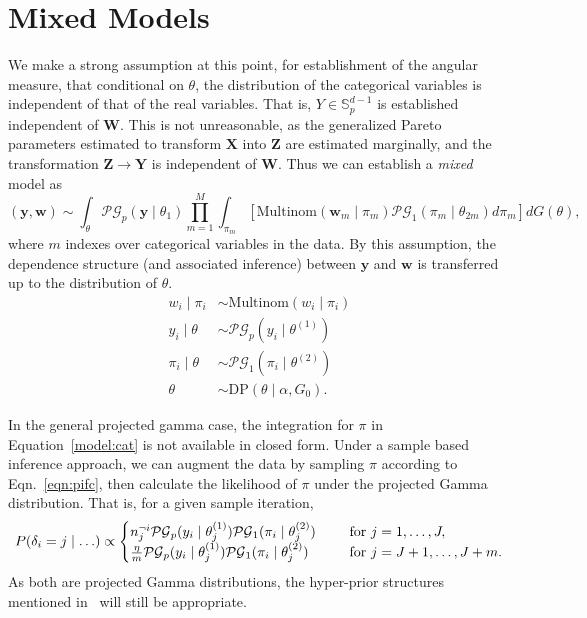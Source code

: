 \section{Mixed Models}
We make a strong assumption at this point, for establishment of the angular measure,
that conditional on $\theta$, the distribution of the categorical variables is independent 
of that of the real variables.  That is, $Y \in {\mathbb S}_{p}^{d-1}$ is established
independent of $\bm{W}$.  This is not unreasonable, as the generalized Pareto parameters 
estimated to transform $\bm{X}$ into $\bm{Z}$ are estimated marginally, and the transformation $\bm{Z}\to\bm{Y}$ is independent of $\bm{W}$.  Thus we can establish a \emph{mixed} model as
\begin{equation}
    \label{model:mixed}
    (\bm{y},\bm{w})\sim \int_{\theta}\mathcal{PG}_{p}(\bm{y}\mid\theta_1)\prod_{m = 1}^M\int_{\pi_m}\left[\text{Multinom}(\bm{w}_m\mid\pi_m)\mathcal{PG}_1(\pi_m\mid\theta_{2m})d\pi_{m}\right]dG(\theta),
\end{equation}
where $m$ indexes over categorical variables in the data. By this assumption, the dependence 
structure (and associated inference) between $\bm{y}$ and $\bm{w}$ is transferred up to the 
distribution of $\theta$.
\begin{equation*}
    \label{model:mixeddp}
    \begin{aligned}
    w_i\mid \pi_i &\sim \text{Multinom}(w_i\mid \pi_i)\\
    y_i\mid\theta &\sim\mathcal{PG}_p(y_i\mid\theta^{(1)})\\
    \pi_i\mid\theta &\sim \mathcal{PG}_1(\pi_i\mid\theta^{(2)})\\
    \theta &\sim \text{DP}(\theta\mid\alpha, G_0).
    \end{aligned}
\end{equation*}

In the general projected gamma case, the integration for $\pi$ in Equation~\ref{model:cat} is not
  available in closed form.  Under a sample based inference approach, we can augment the data by 
  sampling $\pi$ according to Eqn.~\ref{eqn:pifc}, then calculate the likelihood of $\pi$ under 
  the projected Gamma distribution.  That is, for a given sample iteration,
\begin{equation*}
    \begin{aligned}
    P(\delta_i = j\mid \ldots) \propto \begin{cases} 
    n_j^{\neg i}\mathcal{PG}_p(y_i\mid\theta_j^{(1)})\mathcal{PG}_1(\pi_i\mid\theta_j^{(2)}) \hspace{0.5cm}&\text{for }j = 1,\ldots,J,\\
    \frac{\eta}{m}\mathcal{PG}_p(y_i\mid\theta_j^{(1)})\mathcal{PG}_1(\pi_i\mid\theta_j^{(2)}) \hspace{0.5cm}&\text{for }j = J + 1,\ldots, J + m.\\
    \end{cases}
    \end{aligned}
\end{equation*}
As both are projected Gamma distributions, the hyper-prior structures mentioned 
  in~\cite{trubey:pg} will still be appropriate.

